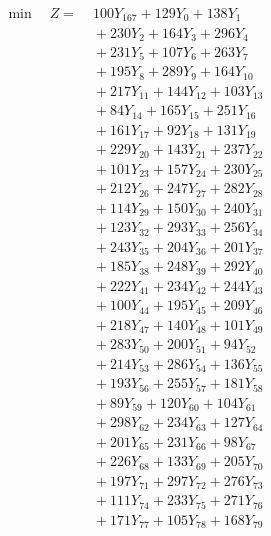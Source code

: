 \documentclass[a4paper,10pt]{article}
\begin{document}
\allowdisplaybreaks
{\small
\begin{align}
\min \quad Z = &\; 100 Y_{167} + 129 Y_{0} + 138 Y_{1} \\[0.3ex]
&\;  + 230 Y_{2} + 164 Y_{3} + 296 Y_{4} \\[0.3ex]
&\;  + 231 Y_{5} + 107 Y_{6} + 263 Y_{7} \\[0.3ex]
&\;  + 195 Y_{8} + 289 Y_{9} + 164 Y_{10} \\[0.3ex]
&\;  + 217 Y_{11} + 144 Y_{12} + 103 Y_{13} \\[0.3ex]
&\;  + 84 Y_{14} + 165 Y_{15} + 251 Y_{16} \\[0.3ex]
&\;  + 161 Y_{17} + 92 Y_{18} + 131 Y_{19} \\[0.3ex]
&\;  + 229 Y_{20} + 143 Y_{21} + 237 Y_{22} \\[0.3ex]
&\;  + 101 Y_{23} + 157 Y_{24} + 230 Y_{25} \\[0.3ex]
&\;  + 212 Y_{26} + 247 Y_{27} + 282 Y_{28} \\[0.5ex]\allowbreak
&\;  + 114 Y_{29} + 150 Y_{30} + 240 Y_{31} \\[0.3ex]
&\;  + 123 Y_{32} + 293 Y_{33} + 256 Y_{34} \\[0.3ex]
&\;  + 243 Y_{35} + 204 Y_{36} + 201 Y_{37} \\[0.3ex]
&\;  + 185 Y_{38} + 248 Y_{39} + 292 Y_{40} \\[0.3ex]
&\;  + 222 Y_{41} + 234 Y_{42} + 244 Y_{43} \\[0.3ex]
&\;  + 100 Y_{44} + 195 Y_{45} + 209 Y_{46} \\[0.3ex]
&\;  + 218 Y_{47} + 140 Y_{48} + 101 Y_{49} \\[0.3ex]
&\;  + 283 Y_{50} + 200 Y_{51} + 94 Y_{52} \\[0.3ex]
&\;  + 214 Y_{53} + 286 Y_{54} + 136 Y_{55} \\[0.3ex]
&\;  + 193 Y_{56} + 255 Y_{57} + 181 Y_{58} \\[0.5ex]\allowbreak
&\;  + 89 Y_{59} + 120 Y_{60} + 104 Y_{61} \\[0.3ex]
&\;  + 298 Y_{62} + 234 Y_{63} + 127 Y_{64} \\[0.3ex]
&\;  + 201 Y_{65} + 231 Y_{66} + 98 Y_{67} \\[0.3ex]
&\;  + 226 Y_{68} + 133 Y_{69} + 205 Y_{70} \\[0.3ex]
&\;  + 197 Y_{71} + 297 Y_{72} + 276 Y_{73} \\[0.3ex]
&\;  + 111 Y_{74} + 233 Y_{75} + 271 Y_{76} \\[0.3ex]
&\;  + 171 Y_{77} + 105 Y_{78} + 168 Y_{79} \\[0.3ex]

\end{align}}
\end{document}
